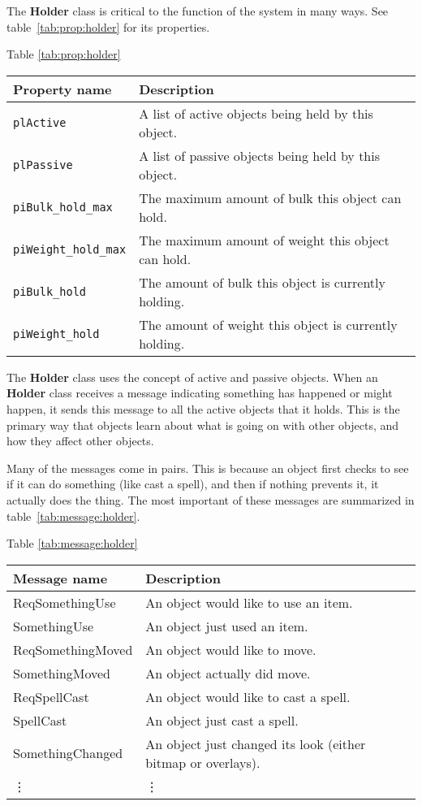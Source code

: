 \documentclass[12pt]{article}
\newcommand{\class}[1]{\textbf{#1}}
\newcommand{\prop}[1]{\texttt{#1}}
\begin{document}
The \class{Holder} class is critical to the function of the system in
many ways.  See table~\ref{tab:prop:holder} for its properties.

\begin{center}
Table \ref{tab:prop:holder}
\begin{tabular}{||l|l||} \hline
Property name & Description 
\\ \hline \hline
\prop{plActive} &  A list of active objects being held by this object.
\\ \hline
\prop{plPassive} &  A list of passive objects being held by this object.
\\ \hline
\prop{piBulk\_hold\_max} &  The maximum amount of bulk this object can hold.
\\ \hline
\prop{piWeight\_hold\_max} &  The maximum amount of weight this object can hold.
\\ \hline
\prop{piBulk\_hold} &  The amount of bulk this object is currently holding.
\\ \hline
\prop{piWeight\_hold} &  The amount of weight this object is currently holding.
\\ \hline
\end{tabular}
\label{tab:prop:holder}
\end{center}

The \class{Holder} class uses the concept of active and passive
objects.  When an \class{Holder} class receives a message indicating
something has happened or might happen, it sends this message to all
the active objects that it holds.  This is the primary way that
objects learn about what is going on with other objects, and how they
affect other objects.

Many of the messages come in pairs.  This is because an object first
checks to see if it can do something (like cast a spell), and then if
nothing prevents it, it actually does the thing.  The most important
of these messages are summarized in table~\ref{tab:message:holder}.

\begin{center}
Table \ref{tab:message:holder}
\begin{tabular}{||l|l||} \hline
Message name & Description 
\\ \hline \hline
ReqSomethingUse &  An object would like to use an item.
\\ \hline
SomethingUse  &  An object just used an item.
\\ \hline
ReqSomethingMoved &  An object would like to move.
\\ \hline
SomethingMoved &  An object actually did move.
\\ \hline
ReqSpellCast &  An object would like to cast a spell.
\\ \hline
SpellCast    & An object just cast a spell.
\\ \hline
SomethingChanged &  An object just changed its look (either bitmap or overlays).
\\ \hline
\vdots & \vdots
\\ \hline
\end{tabular}
\label{tab:message:holder}
\end{center}
\end{document}
